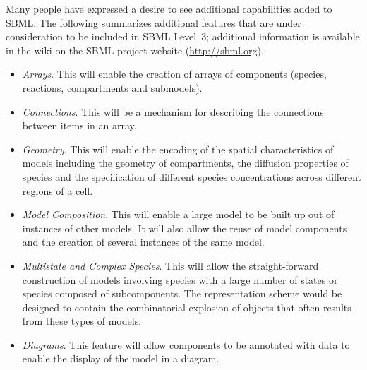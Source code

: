 Many people have expressed a desire to see additional capabilities
added to SBML.  The following summarizes additional features that
are under consideration to be included in SBML Level~3; additional
information is available in the wiki on the SBML project website
(\url{http://sbml.org}).
\begin{itemize}
  
\item \emph{Arrays}.  This will enable the creation of arrays of
  components (species, reactions, compartments and submodels).
  
\item \emph{Connections}.  This will be a mechanism for describing
  the connections between items in an array.
  
\item \emph{Geometry}.  This will enable the encoding of the
  spatial characteristics of models including the geometry of
  compartments, the diffusion properties of species and the
  specification of different species concentrations across
  different regions of a cell.
  
\item \emph{Model Composition}.  This will enable a large model to
  be built up out of instances of other models.  It will also
  allow the reuse of model components and the creation of several
  instances of the same model.
  
\item \emph{Multistate and Complex Species}.  This will allow the
  straight-forward construction of models involving species with a
  large number of states or species composed of subcomponents.
  The representation scheme would be designed to contain the
  combinatorial explosion of objects that often results from these
  types of models.
  
\item \emph{Diagrams}.  This feature will allow components to be
  annotated with data to enable the display of the model in a
  diagram.
  

\end{itemize}
